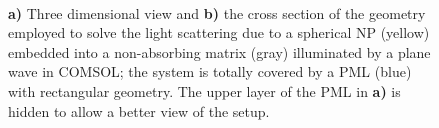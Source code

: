 \begin{figure}[b!]
	\centering
     \small
     \def\svgwidth{.8\textwidth}
     \hspace*{-.2\textwidth}
       \begin{subfigure}{.2\textwidth}\caption{ }\label{fig:setup:a}\end{subfigure}%
     \hspace*{-6em}%
       \begin{subfigure}{.78\textwidth}\caption{ }\label{fig:setup:b}\end{subfigure}
     \vspace*{-2.5em}\\
 \vspace*{0em}
\caption[Boxed Particle Setup in COMSOL]{\textbf{a)} Three dimensional view and \textbf{b)} the cross section of the geometry employed to solve the light scattering due to a  spherical NP (yellow) embedded into a non-absorbing matrix (gray) illuminated by a plane wave in COMSOL; the system is totally covered by a PML (blue) with rectangular geometry. The upper layer of the PML in \textbf{a)} is hidden to allow a better view of the setup.}
\label{fig:setup}
\end{figure}
%
